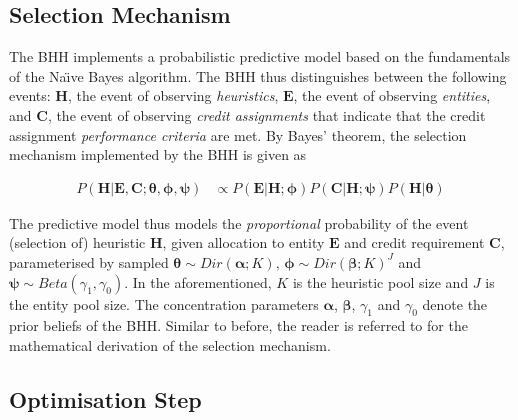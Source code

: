 \subsection{Selection Mechanism}\label{sec:bhh:selection_mechanism}

The \acs{BHH} implements a probabilistic predictive model based on the fundamentals of the Na\"{\i}ve Bayes algorithm. The \acs{BHH} thus distinguishes between the following events: \textbf{$\boldsymbol{H}$}, the event of observing \textit{heuristics}, \textbf{$\boldsymbol{E}$}, the event of observing \textit{entities}, and \textbf{$\boldsymbol{C}$}, the event of observing \textit{credit assignments} that indicate that the credit assignment \textit{performance criteria} are met. By Bayes' theorem, the selection mechanism implemented by the \acs{BHH} is given as

\begin{equation}
	\label{eq:bhh:selection_mechanism:predictive_model_prop_to}
	\begin{split}
		P(\boldsymbol{H} \vert \boldsymbol{E}, \boldsymbol{C}; \boldsymbol{\theta}, \boldsymbol{\phi}, \boldsymbol{\psi}) &\propto P(\boldsymbol{E} \vert \boldsymbol{H}; \boldsymbol{\phi}) P(\boldsymbol{C} \vert \boldsymbol{H}; \boldsymbol{\psi}) P(\boldsymbol{H} \vert \boldsymbol{\theta})
	\end{split}
\end{equation}

The predictive model thus models the \textit{proportional} probability of the event (selection of) heuristic $\boldsymbol{H}$, given allocation to entity $\boldsymbol{E}$ and credit requirement $\boldsymbol{C}$, parameterised by sampled $\boldsymbol{\theta} \sim Dir(\boldsymbol{\alpha}; K)$, $\boldsymbol{\phi} \sim Dir(\boldsymbol{\beta}; K)^{J}$ and $\boldsymbol{\psi} \sim Beta(\gamma_{1}, \gamma_{0})$. In the aforementioned, $K$ is the heuristic pool size and $J$ is the entity pool size. The concentration parameters $\boldsymbol{\alpha}$, $\boldsymbol{\beta}$, $\gamma_{1}$ and $\gamma_{0}$ denote the prior beliefs of the \acs{BHH}. Similar to before, the reader is referred to \cite{ref:schreuder:2022} for the mathematical derivation of the selection mechanism.

\subsection{Optimisation Step}\label{sec:bhh:optimisation_step}

